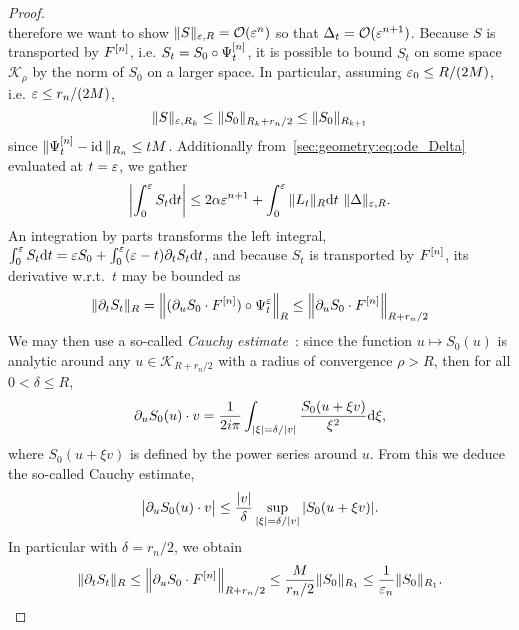 \begin{proof}
\begin{equation}
\end{equation}
therefore we want to show $\| S \|_{\varepsilon, R} = \mathcal{O}( \varepsilon^{n} )$ so
that $\Delta_t = \mathcal{O}(\varepsilon^{n+1})$. Because $S$ is transported by $F^{[n]}$, i.e. $S_t = S_0 \circ \Psi^{[n]} _t$, it is possible to bound $S_t$
on some space $\mathcal{K}_\rho$ by the norm of $S_0$ on a larger space.
In particular, assuming $\varepsilon_0 \leq R/(2M)$, i.e. $\varepsilon \leq r_n/(2M)$,
\begin{equation} \label{sec:geom:eq:transported_bound}
  \| S \|_{\varepsilon, R_k} 
  \leq \| S_0 \| _{R_k + r_n/2} 
  \leq \| S_0 \| _{R_{k+1}}
\end{equation}
since $\| \Psi^{[n]} _t - \operatorname{id} \|_{R_n} \leq t M $. Additionally
from~\eqref{sec:geometry:eq:ode_Delta} evaluated at $t = \varepsilon$, we
gather 
\begin{equation} \label{sec:geom:eq:avg_S}
  \left| \int_0^\varepsilon S_t \mathrm{d} t \right|
  \leq 2\alpha \varepsilon^{n+1} 
    + \int_0^\varepsilon \|L_t\|_{R} \mathrm{d} t \ \| \Delta \|_{\varepsilon, R} .
\end{equation}
An integration by parts transforms the left integral, $\int_0^\varepsilon S_t
\mathrm{d} t = \varepsilon S_0 + \int_0^\varepsilon (\varepsilon - t) \partial_t S_t \mathrm{d} t$, and because
$S_t$ is transported by $F^{[n]}$, its derivative w.r.t.~$t$ may be
bounded as
\begin{equation*}
  \| \partial_t S_t \|_R 
  = \left\| (\partial_u S_0 \cdot F^{[n]}) \circ \Psi^\varepsilon _t \right\|_R
  \leq \left\| \partial_u S_0 \cdot F^{[n]} \right\|_{R+r_n/2}
\end{equation*}
We may then use a so-called \textit{Cauchy estimate}~: since the
function $u \mapsto S_0(u)$ is analytic around any $u \in \mathcal{K}_{R
+ r_n/2}$ with a radius of convergence $\rho > R$, then for all $0 <
\delta \leq R$, 
\begin{equation*}
  \partial_u S_0(u) \cdot v = \frac{1}{2i\pi}
    \int_{|\xi| = \delta/|v|} \frac{S_0(u+\xi v)}{\xi^2} \mathrm{d} \xi ,
\end{equation*}
where $S_0(u + \xi v)$ is defined by the power series around $u$.
From this we deduce the so-called Cauchy estimate,
\begin{equation} \label{sec:intro:eq:cauchy}
  \big| \partial_u S_0(u) \cdot v \big| 
  \leq \frac{|v|}{\delta} 
    \sup_{|\xi| = \delta/|v|} |S_0(u + \xi v)| .
\end{equation}
In particular with $\delta = r_n/2$, we obtain 
\begin{equation*}
  \| \pa_t S_t \|_R 
  \leq \left\| \pa_u S_0 \cdot F\rk n \right\|_{R+r_n/2}
  \leq \frac{M}{r_n/2} \| S_0 \|_{R_1} 
  \leq \frac{1}{\eps_n} \| S_0 \|_{R_1} .

\end{equation*}
\end{proof}
